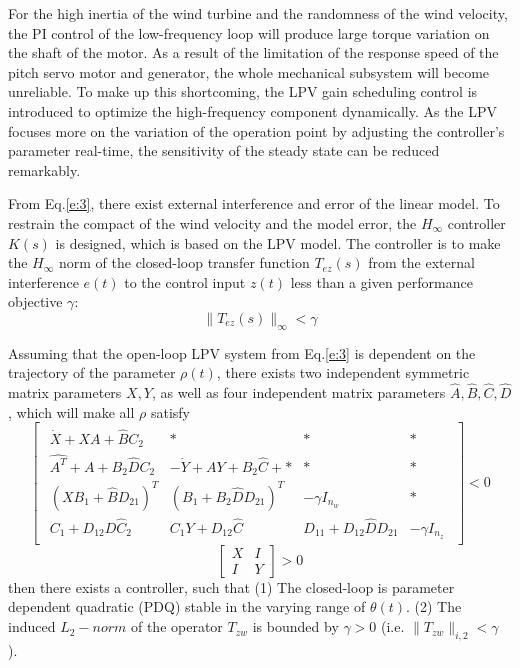 \documentclass[english]{cccconf}
\begin{document}
For the high inertia of the wind turbine and the randomness of the wind
velocity, the PI control of the low-frequency loop will produce large
torque variation on the shaft of the motor. As a result of the limitation
of the response speed of the pitch servo motor and generator, the whole
mechanical subsystem will become unreliable. To make up this shortcoming,
the LPV gain scheduling control is introduced to optimize
the high-frequency component dynamically. As the LPV focuses more on the
variation of the operation point by adjusting the controller's parameter
real-time, the sensitivity of the steady state can be reduced remarkably.

From Eq.\ref{e:3}, there exist external interference and error of the linear
model. To restrain the compact of the wind velocity and the model error, the
$H_\infty$ controller $K(s)$ is designed, which is based on the LPV model.
The controller is to make the $H_\infty$ norm of the closed-loop transfer
function $T_{ez}(s)$ from the external interference $e(t)$ to the control
input $z(t)$ less than a given performance objective $\gamma$:
\begin{equation}\label{e:9}
  \| T_{ez}(s) \|_\infty < \gamma
\end{equation}

Assuming that the open-loop LPV system from Eq.\ref{e:3} is dependent on
the trajectory of the parameter $\rho(t)$, there exists two independent
symmetric matrix parameters $X, Y$, as well as four independent matrix
parameters $\hat{A}, \hat{B}, \hat{C}, \hat{D}$, which will make all $\rho$
satisfy
\begin{equation}\label{e:10}
  \begin{bmatrix}
  \begin{smallmatrix}
    \dot{X}+XA+\hat{B}C_2   &   \ast    &   \ast    &   \ast    \\
    \hat{A^T}+A+B_2\hat{D}C_2   & -\dot{Y}+AY+B_2\hat{C}+{\ast} & \ast & \ast \\
    (XB_1+\hat{B}D_{21})^T  & (B_1+B_2\hat{D}D_{21})^T & -\gamma{I_{n_w}} & \ast \\
    C_1+D_{12}D\hat{C}_2 & C_1{}Y+D_{12}\hat{C} & D_{11}+D_{12}\hat{D}D_{21} & -\gamma{}I_{n_z}
  \end{smallmatrix}
  \end{bmatrix}
  <0
\end{equation}
\begin{equation}
    \begin{bmatrix}\label{e:11}
  X &   I   \\
  I &   Y
  \end{bmatrix}>0
\end{equation}
then there exists a controller\cite{lit:8,lit:9}, such that\newline
(1) The closed-loop is parameter dependent quadratic (PDQ) stable in the varying
    range of $\theta(t)$. \newline
(2) The induced $L_2{}-norm$ of the operator $T_{zw}$ is bounded by $\gamma>0$
    (i.e. $\| T_{zw}\|_{i,2} < \gamma $ ).
\end{document}
